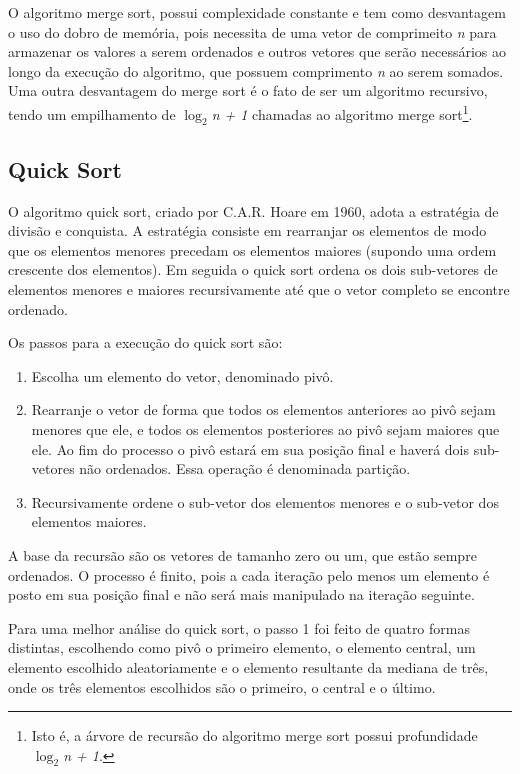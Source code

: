 \documentclass[fleqn,10pt]{SelfArx} %
\begin{document}
O algoritmo merge sort, possui complexidade constante e tem como desvantagem o uso do dobro de memória,
 pois necessita de uma vetor de comprimeito \emph{n} para armazenar os valores a serem ordenados e outros vetores que 
 serão necessários ao longo da execução do algoritmo, que possuem comprimento \emph{n} ao serem somados. Uma outra 
 desvantagem do merge sort é o fato de ser um algoritmo recursivo, tendo um empilhamento de \emph{$\log_2$n + 1} 
 chamadas ao algoritmo merge sort\footnote{Isto é, a árvore de recursão do algoritmo merge sort possui profundidade 
 \emph{$\log_2$n + 1}.}.

\subsection{Quick Sort}

O algoritmo quick sort, criado por C.A.R. Hoare em 1960, adota a estratégia de divisão e conquista. A estratégia consiste 
em rearranjar os elementos de modo que os elementos menores precedam os elementos maiores (supondo uma ordem crescente dos 
elementos). Em seguida o quick sort ordena os dois sub-vetores de elementos menores e maiores 
recursivamente até que o vetor completo se encontre ordenado.

Os passos para a execução do quick sort são:
\begin{enumerate}
	\item Escolha um elemento do vetor, denominado pivô.

	\item Rearranje o vetor de forma que todos os elementos anteriores ao pivô sejam menores que ele, e todos os elementos
	 posteriores ao pivô sejam maiores que ele. Ao fim do processo o pivô estará em sua posição final e haverá dois sub-
	 vetores não ordenados. Essa operação é denominada partição.
	
	\item Recursivamente ordene o sub-vetor dos elementos menores e o sub-vetor dos elementos maiores.
\end{enumerate}
A base da recursão são os vetores de tamanho zero ou um, que estão sempre ordenados. O processo é finito, pois a cada 
iteração pelo menos um elemento é posto em sua posição final e não será mais manipulado na iteração seguinte.

Para uma melhor análise do quick sort, o passo 1 foi feito de quatro formas distintas, escolhendo como pivô o primeiro 
elemento, o elemento central, um elemento escolhido aleatoriamente e o elemento resultante da mediana de três, onde os três 
elementos escolhidos são o primeiro, o central e o último.
\end{document}

